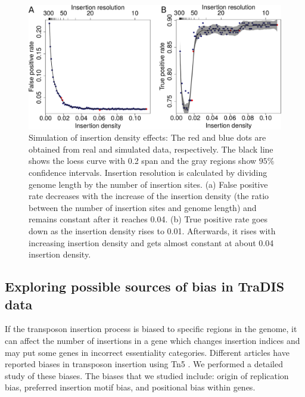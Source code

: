 \documentclass[12pt,letterpaper]{article}
\begin{document}
\begin{figure}[ht]
\includegraphics[scale=0.45]{fig2.pdf}
\caption{Simulation of insertion density effects: The red and blue dots are obtained from real and simulated data, respectively. The black line shows the loess curve with 0.2 span and the gray regions show $95\%$ confidence intervals. Insertion resolution is calculated by dividing genome length by the number of insertion sites. (a) False positive rate decreases with the increase of the insertion density (the ratio between the number of insertion sites and genome length) and remains constant after it reaches 0.04. (b) True positive rate goes down as the insertion density rises to 0.01. Afterwards, it rises with increasing insertion density and gets almost constant at about 0.04 insertion density.}
\label{fig:fig2}
\end{figure}

\subsection{Exploring possible sources of bias in TraDIS data}
If the transposon insertion process is biased to specific regions in the genome, it can affect the number of insertions in a gene which changes insertion indices and may put some genes in incorrect essentiality categories. Different articles have reported biases in transposon insertion using Tn5 \cite{goryshin_tn5/is50_1998, langridge_simultaneous_2009, gallagher_genome-scale_2011, canals_high-throughput_2012, green_insertion_2012, zomer_essentials:_2012, barquist_comparison_2013, rubin_essential_2015}. We performed a detailed study of these biases. The biases that we studied include: origin of replication bias, preferred insertion motif bias, and positional bias within genes.
\end{document}

